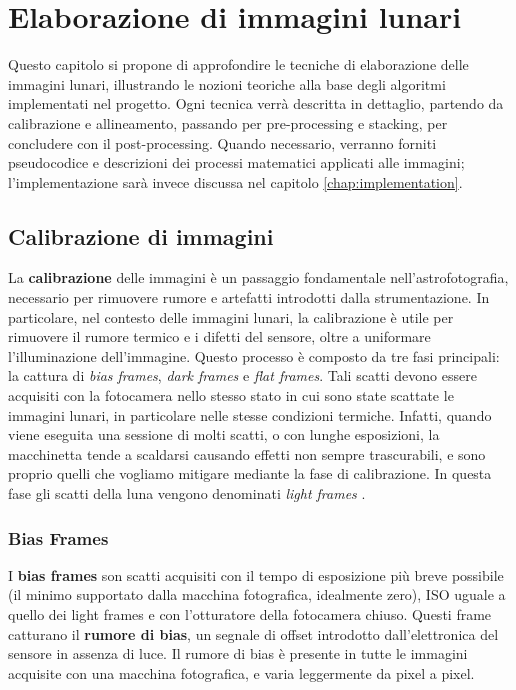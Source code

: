 \chapter{Elaborazione di immagini lunari} \label{chap:techniques}

Questo capitolo si propone di approfondire le tecniche di elaborazione delle immagini lunari, illustrando le nozioni teoriche alla base degli algoritmi implementati nel progetto. Ogni tecnica verrà descritta in dettaglio, partendo da calibrazione e allineamento, passando per pre-processing e stacking, per concludere con il post-processing. Quando necessario, verranno forniti pseudocodice e descrizioni dei processi matematici applicati alle immagini; l'implementazione sarà invece discussa nel capitolo \ref{chap:implementation}.

\section{Calibrazione di immagini} \label{sec:calibration}

La \textbf{calibrazione} delle immagini è un passaggio fondamentale nell'astrofotografia, necessario per rimuovere rumore e artefatti introdotti dalla strumentazione. In particolare, nel contesto delle immagini lunari, la calibrazione è utile per rimuovere il rumore termico e i difetti del sensore, oltre a uniformare l'illuminazione dell'immagine. Questo processo è composto da tre fasi principali: la cattura di \textit{bias frames}, \textit{dark frames} e \textit{flat frames}. Tali scatti devono essere acquisiti con la fotocamera nello stesso stato in cui sono state scattate le immagini lunari, in particolare nelle stesse condizioni termiche. Infatti, quando viene eseguita una sessione di molti scatti, o con lunghe esposizioni, la macchinetta tende a scaldarsi causando effetti non sempre trascurabili, e sono proprio quelli che vogliamo mitigare mediante la fase di calibrazione. In questa fase gli scatti della luna vengono denominati \textit{light frames}  \cite{calibration}.

\subsection{Bias Frames} \label{subsec:bias}

I \textbf{bias frames} son scatti acquisiti con il tempo di esposizione più breve possibile (il minimo supportato dalla macchina fotografica, idealmente zero), ISO uguale a quello dei light frames e con l'otturatore della fotocamera chiuso. Questi frame catturano il \textbf{rumore di bias}, un segnale di offset introdotto dall'elettronica del sensore in assenza di luce. Il rumore di bias è presente in tutte le immagini acquisite con una macchina fotografica, e varia leggermente da pixel a pixel.

